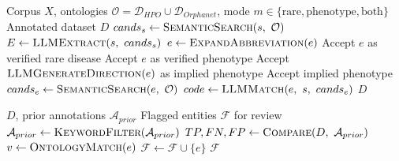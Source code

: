 \begin{algorithm}[H]
\caption{RDMA: Mining Pipeline}
\label{alg:rdma}
{\small
\begin{algorithmic}[1]
\Require Corpus $X$, ontologies $\mathcal{O} = \mathcal{D}_{HPO} \cup \mathcal{D}_{Orphanet}$, mode $m \in \{\text{rare}, \text{phenotype}, \text{both}\}$
\Ensure Annotated dataset $D$
        \State $cands_s \gets \Call{SemanticSearch}{s,\ \mathcal{O}}$
        \State $E \gets \Call{LLMExtract}{s,\ cands_s}$
    \EndFor
            \State $e \gets \Call{ExpandAbbreviation}{e}$
                \State Accept $e$ as verified rare disease
            \EndIf
        \EndIf
                \State Accept $e$ as verified phenotype
                \State Accept $\Call{LLMGenerateDirection}{e}$ as implied phenotype
                \State Accept implied phenotype
            \EndIf
        \EndIf
    \EndFor
        \State $cands_e \gets \Call{SemanticSearch}{e,\ \mathcal{O}}$
        \State $code \gets \Call{LLMMatch}{e,\ s,\ cands_e}$
    \EndFor
\EndFor
\State \Return $D$
\end{algorithmic}
}
\end{algorithm}

\begin{algorithm}[H]
\caption{RDMA: Dataset Refinement}
\label{alg:rdma_refinement}
{\small
\begin{algorithmic}[1]
\Require $D$, prior annotations $\mathcal{A}_{prior}$
\Ensure Flagged entities $\mathcal{F}$ for review
\State $\mathcal{A}_{prior} \gets \Call{KeywordFilter}{\mathcal{A}_{prior}}$
\State $TP, FN, FP \gets \Call{Compare}{D,\ \mathcal{A}_{prior}}$
    \State $v \gets \Call{OntologyMatch}{e}$
        \State $\mathcal{F} \gets \mathcal{F} \cup \{e\}$
    \EndIf
\EndFor
\State \Return $\mathcal{F}$
\end{algorithmic}
}
\end{algorithm}


